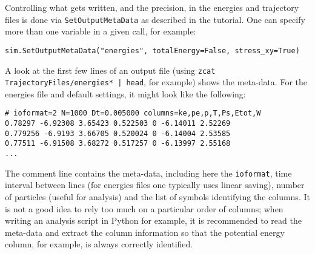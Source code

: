 \documentclass[a4paper]{article}
\begin{document}
Controlling what gets written, and the precision, in the energies and trajectory
files is done via \verb|SetOutputMetaData| as described in the tutorial. One
can specify more than one variable in a given call, for example:

\begin{verbatim}
sim.SetOutputMetaData("energies", totalEnergy=False, stress_xy=True)
\end{verbatim}
A look at the first few lines of an output file (using 
\verb^zcat TrajectoryFiles/energies* | head^, for example) shows the meta-data.
For the energies file and default settings, it might look like the following:

\begin{verbatim}
# ioformat=2 N=1000 Dt=0.005000 columns=ke,pe,p,T,Ps,Etot,W
0.78297 -6.92308 3.65423 0.522503 0 -6.14011 2.52269 
0.779256 -6.9193 3.66705 0.520024 0 -6.14004 2.53585 
0.77511 -6.91508 3.68272 0.517257 0 -6.13997 2.55168 
...
\end{verbatim}


The comment line contains the meta-data, including here the \verb|ioformat|, time interval between lines (for energies files one typically uses linear saving), 
number of particles (useful for analysis) and the 
list of symbols identifying the columns. 
It is not a good idea to rely too much on a particular
order of columns; when writing an analysis script in Python for example, it is
recommended to read the meta-data and extract the column information so that
the potential energy column, for example, is always correctly identified.
\end{document}
